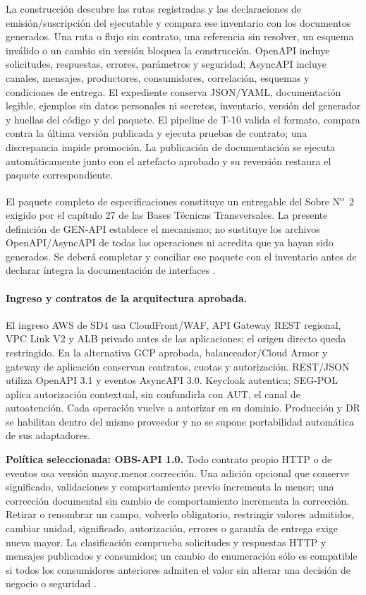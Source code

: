 La construcción descubre las rutas registradas y las declaraciones de emisión/suscripción del ejecutable y compara ese inventario con los documentos generados. Una ruta o flujo sin contrato, una referencia sin resolver, un esquema inválido o un cambio sin versión bloquea la construcción. OpenAPI incluye solicitudes, respuestas, errores, parámetros y seguridad; AsyncAPI incluye canales, mensajes, productores, consumidores, correlación, esquemas y condiciones de entrega. El expediente conserva JSON/YAML, documentación legible, ejemplos sin datos personales ni secretos, inventario, versión del generador y huellas del código y del paquete. El pipeline de T-10 valida el formato, compara contra la última versión publicada y ejecuta pruebas de contrato; una discrepancia impide promoción. La publicación de documentación se ejecuta automáticamente junto con el artefacto aprobado y su reversión restaura el paquete correspondiente.

El paquete completo de especificaciones constituye un entregable del Sobre N\textsuperscript{o}~2 exigido por el capítulo 27 de las Bases Técnicas Transversales. La presente definición de GEN-API establece el mecanismo; no sustituye los archivos OpenAPI/AsyncAPI de todas las operaciones ni acredita que ya hayan sido generados. Se deberá completar y conciliar ese paquete con el inventario antes de declarar íntegra la documentación de interfaces \parencite[cap.~27, ítem~7, p.~48]{bases-transversales}.

\paragraph{Ingreso y contratos de la arquitectura aprobada.}
El ingreso AWS de SD4 usa CloudFront/WAF, API Gateway REST regional, VPC Link V2 y ALB privado antes de las aplicaciones; el origen directo queda restringido. En la alternativa GCP aprobada, balanceador/Cloud Armor y gateway de aplicación conservan contratos, cuotas y autorización. REST/JSON utiliza OpenAPI 3.1 y eventos AsyncAPI 3.0. Keycloak autentica; SEG-POL aplica autorización contextual, sin confundirla con AUT, el canal de autoatención. Cada operación vuelve a autorizar en su dominio. Producción y DR se habilitan dentro del mismo proveedor y no se supone portabilidad automática de sus adaptadores.

\textbf{Política seleccionada: OBS-API 1.0.} Todo contrato propio HTTP o de eventos usa versión mayor.menor.corrección. Una adición opcional que conserve significado, validaciones y comportamiento previo incrementa la menor; una corrección documental sin cambio de comportamiento incrementa la corrección. Retirar o renombrar un campo, volverlo obligatorio, restringir valores admitidos, cambiar unidad, significado, autorización, errores o garantía de entrega exige nueva mayor. La clasificación comprueba solicitudes y respuestas HTTP y mensajes publicados y consumidos; un cambio de enumeración sólo es compatible si todos los consumidores anteriores admiten el valor sin alterar una decisión de negocio o seguridad \parencite[RT-05.17, p.~12]{bases-transversales}.

